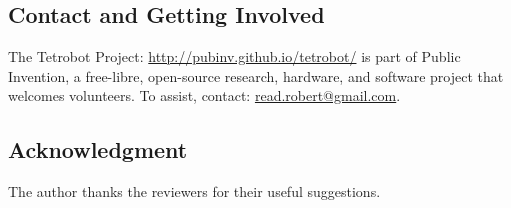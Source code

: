 \documentclass[10pt,final]{journals-1.0/asme2ej}
\begin{document}
\subsection{Contact and Getting Involved}

The Tetrobot Project:  
\url{http://pubinv.github.io/tetrobot/} is part of Public Invention,
a free-libre, open-source research, hardware, and software project that welcomes volunteers.
To assist, contact:
\href{mailto:read.robert@gmail.com}{read.robert@gmail.com}.


\subsection{Acknowledgment}

The author thanks the reviewers for their useful suggestions.



\end{document}
